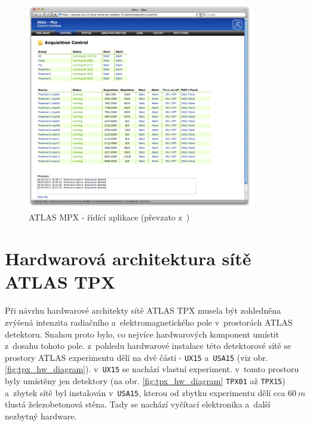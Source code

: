 \begin{figure}[ht]
	\begin{center}
		\includegraphics[width=10cm]{figures/mpx_web.png}
		\caption{ATLAS MPX - řídící aplikace (převzato z~\cite{TurecekThesis2011})}
		\label{fig:mpx_web}
	\end{center}
\end{figure}

\section{Hardwarová architektura sítě ATLAS TPX}\label{atlas:hw_arch}
Při návrhu hardwarové architekty sítě ATLAS TPX musela být zohledněna zvýšená intenzita radiačního a~elektromagnetického pole v~prostorách ATLAS detektoru. Snahou proto bylo, co nejvíce hardwarových komponent umístit z~dosahu tohoto pole. z~pohledu hardwarové instalace této detektorové sítě se prostory ATLAS experimentu dělí na dvě části - \texttt{UX15} a~\texttt{USA15} (viz obr. \ref{fig:tpx_hw_diagram}). v~\texttt{UX15} se nachází vlastní experiment. v~tomto prostoru byly umístěny jen detektory (na obr. \ref{fig:tpx_hw_diagram} \texttt{TPX01} až \texttt{TPX15}) a~zbytek sítě byl instalován v~\texttt{USA15}, kterou od zbytku experimentu dělí cca $60~m$ tlustá železobetonová stěna. Tady se nachází vyčítací elektronika a~další nezbytný hardware.

